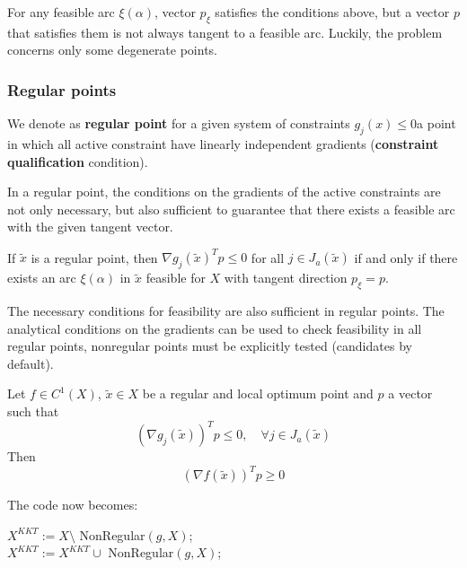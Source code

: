 For any feasible arc $\xi (\alpha)$, vector $p_\xi$ satisfies the conditions above, but a vector $p$ that satisfies them is not always tangent to a feasible arc. Luckily, the problem concerns only some degenerate points.

\subsubsection{Regular points}

\begin{definition}
	We denote as \textbf{regular point} for a given system of constraints $g_j (x) \leq 0$a point in which all active constraint have linearly independent gradients (\textbf{constraint qualification} condition).
\end{definition}

In a regular point, the conditions on the gradients of the active constraints are not only necessary, but also sufficient to guarantee that there exists a feasible arc with the given tangent vector. \\

\begin{theo}
	If $\tilde x$ is a regular point, then $\nabla g_j (\tilde x)^T p \leq 0$ for all $j \in J_a (\tilde x)$ if and only if there exists an arc $\xi (\alpha)$ in $\tilde x$ feasible for $X$ with tangent direction $p_\xi = p$.
\end{theo}

The necessary conditions for feasibility are also sufficient in regular points. The analytical conditions on the gradients can be used to check feasibility in all regular points, nonregular points must be explicitly tested (candidates by default). \\

\begin{coro}
	\label{cor:firstgeo}
	Let $f \in C^1 (X)$, $\tilde x \in X$ be a regular and local optimum point and $p$ a vector such that
	$$ (\nabla g_j (\tilde x))^T p \leq 0, \quad \forall j \in J_a (\tilde x) $$
	Then 
	$$ (\nabla f(\tilde x))^T p \geq 0 $$
\end{coro}

The code now becomes:
\begin{myalgo}{0.85}
	$X^{KKT} := X \setminus$ NonRegular$(g, X)$; \\
	$X^{KKT} := X^{KKT} \cup $ NonRegular$(g,X)$; \\
\end{myalgo}

